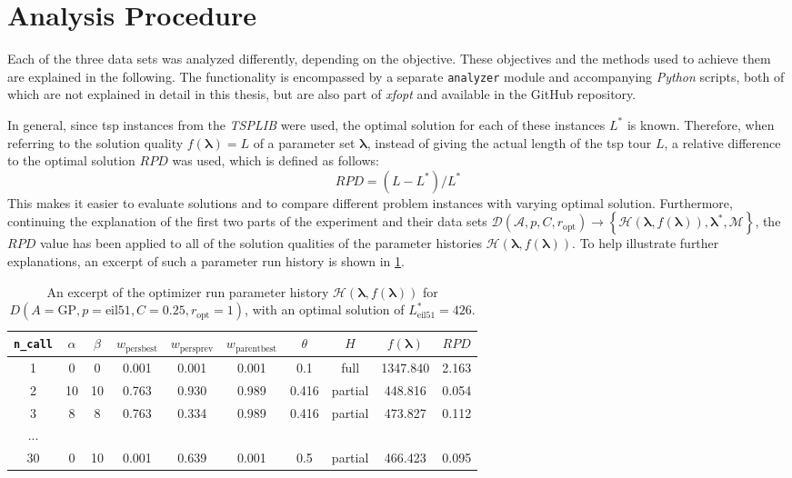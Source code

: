 \section{Analysis Procedure}
\label{chap:analysis}

Each of the three data sets was analyzed differently, depending on the objective. These objectives and the methods used to achieve them are explained in the following. The functionality is encompassed by a separate \texttt{analyzer} module and accompanying \textit{Python} scripts, both of which are not explained in detail in this thesis, but are also part of \textit{\gls{xfopt}} and available in the GitHub repository. 

In general, since \gls{tsp} instances from the \textit{TSPLIB} were used, the optimal solution for each of these instances $L^*$ is known. Therefore, when referring to the solution quality $f(\mathbf{\lambda}) = L$ of a parameter set $\mathbf{\lambda}$, instead of giving the actual length of the \gls{tsp} tour $L$, a relative difference to the optimal solution $RPD$ was used, which is defined as follows:
\begin{equation}
	\label{eq:rpd}
	RPD = (L - L^*) / L^*
\end{equation}
This makes it easier to evaluate solutions and to compare different problem instances with varying optimal solution.
Furthermore, continuing the explanation of the first two parts of the experiment and their data sets $\mathcal{D}(\mathcal{A},p,C,r_\text{opt}) \to \left\lbrace \mathcal{H}(\mathbf{\lambda}, f(\mathbf{\lambda})), \mathbf{\lambda^*}, \mathcal{M} \right\rbrace$, the $RPD$ value has been applied to all of the solution qualities of the parameter histories $\mathcal{H}(\mathbf{\lambda}, f(\mathbf{\lambda}))$.
To help illustrate further explanations, an excerpt of such a parameter run history is shown in \cref{tab:part1-2-history}.

\begin{table}
	\centering
	\caption[An excerpt of the optimizer run parameter history]{An excerpt of the optimizer run parameter history $\mathcal{H}(\mathbf{\lambda}, f(\mathbf{\lambda}))$ for $D\left( A=\text{GP}, p=\text{eil51}, C=0.25, r_\text{opt} = 1\right) $, with an optimal solution of $L^*_\text{eil51}=426$.}
	\label{tab:part1-2-history}
	\begin{tabular}{c c c c c c c c c c}
		\hline
		\texttt{n\_call} & $\alpha$ & $\beta$ & $w_{\text{persbest}}$ & $w_{\text{persprev}}$& $w_{\text{parentbest}}$ & $\theta$ & $H$ & $f(\mathbf{\lambda})$ & $RPD$ \\ \hline
		1 & 0 & 0 & 0.001 & 0.001 & 0.001 & 0.1 & full & 1347.840 & 2.163\\
		2 & 10 & 10 & 0.763 & 0.930 & 0.989 & 0.416 & partial & 448.816 & 0.054 \\
		3 & 8 & 8 & 0.763 & 0.334 & 0.989 & 0.416 & partial & 473.827 &  0.112\\
		... & ~ & ~ & ~ & ~ & ~ & ~ & ~ & ~ & ~ \\
		30 & 0 & 10 & 0.001 & 0.639 & 0.001 & 0.5 & partial & 466.423 & 0.095\\ \hline
	\end{tabular}
\end{table}

